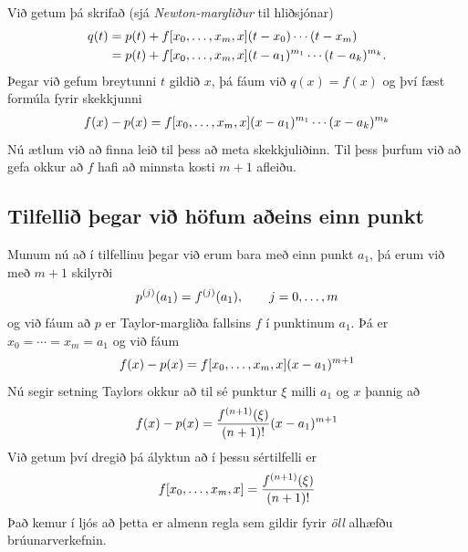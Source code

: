 \documentclass[letterpaper,10pt,icelandic]{sphinxmanual}
\begin{document}
Við getum þá skrifað (sjá \emph{Newton-margliður} til hliðsjónar)
\begin{gather}
\begin{split}\begin{aligned}
  q(t) &= p(t) + f[x_0,\ldots,x_m,x](t-x_0)\cdots(t-x_m) \\
  &= p(t) + f[x_0,\ldots,x_m,x](t-a_1)^{m_1}\cdots(t-a_k)^{m_k}.\end{aligned}\end{split}\notag
\end{gather}
Þegar við gefum breytunni \(t\) gildið \(x\), þá fáum við
\(q(x) = f(x)\) og því fæst formúla fyrir skekkjunni
\begin{gather}
\begin{split}f(x) - p(x)
  = f[x_0,\ldots,x_m,x](x-a_1)^{m_1}\cdots(x-a_k)^{m_k}\end{split}\notag
\end{gather}
Nú ætlum við að finna leið til þess að meta skekkjuliðinn. Til þess
þurfum við að gefa okkur að \(f\) hafi að minnsta kosti \(m+1\)
afleiðu.


\subsection{Tilfellið þegar við höfum aðeins einn punkt}
\label{kafli03:tilfelli-egar-vi-hofum-aeins-einn-punkt}
Munum nú að í tilfellinu þegar við erum bara með einn punkt \(a_1\),
þá erum við með \(m+1\) skilyrði
\begin{gather}
\begin{split}p^{(j)}(a_1)=f^{(j)}(a_1), \qquad j=0,\dots,m\end{split}\notag
\end{gather}
og við fáum að \(p\) er Taylor-margliða fallsins \(f\) í
punktinum \(a_1\). Þá er \(x_0=\cdots=x_m=a_1\) og við fáum
\begin{gather}
\begin{split}f(x) - p(x)
  = f[x_0,\ldots,x_m,x](x-a_1)^{m+1}\end{split}\notag
\end{gather}
Nú segir setning Taylors okkur að til sé punktur \(\xi\) milli
\(a_1\) og \(x\) þannig að
\begin{gather}
\begin{split}f(x) - p(x)
  = \dfrac{f^{(n+1)}(\xi)}{(n+1)!}(x-a_1)^{m+1}\end{split}\notag
\end{gather}
Við getum því dregið þá ályktun að í þessu sértilfelli er
\begin{gather}
\begin{split}f[x_0,\ldots,x_m,x]=\dfrac{f^{(n+1)}(\xi)}{(n+1)!}\end{split}\notag
\end{gather}
Það kemur í ljós að þetta er almenn regla sem gildir fyrir \emph{öll}
alhæfðu brúunarverkefnin.
\end{document}
